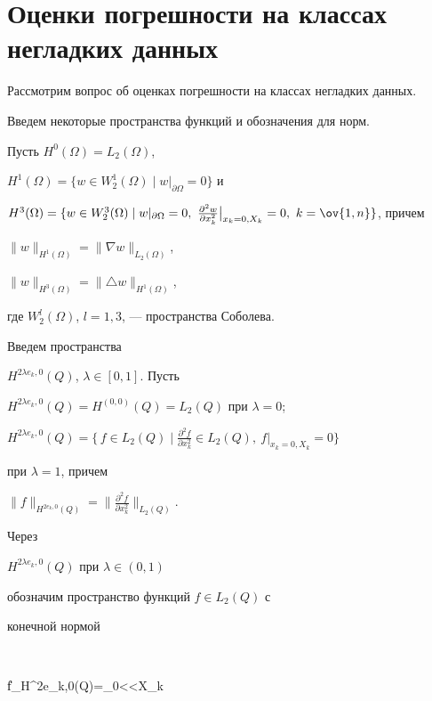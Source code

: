 \section{Оценки погрешности на классах негладких данных}





Рассмотрим вопрос об оценках погрешности на классах негладких данных.


Введем некоторые пространства функций и обозначения для норм.


Пусть $H^0(\Omega)=L_2(\Omega)$, 


$H^1(\Omega)=\{w\in W_2^1(\Omega)\mid


w|_{\partial\Omega}=0\}$ и


$H^3(\Omega)=\{w\in W_2^3(\Omega)\mid


w|_{\partial\Omega}=0,\ 


\frac{\partial^2 w}{\partial x_k^2}\big|_{x_k=0,X_k}=0,\ 


k=\ov{1,n}\}$, причем


$\|w\|_{H^1(\Omega)}=


\|\nabla w\|_{L_2(\Omega)}$,


$\|w\|_{H^3(\Omega)}=\|\triangle w\|_{H^1(\Omega)}$,


где $W_2^l(\Omega)$, $l=1,3$, --- пространства Соболева.





Введем пространства 


$H^{2\lambda e_k,0}(Q)$, $\lambda\in[0,1]$. Пусть


$H^{2\lambda e_k,0}(Q)=H^{(0,0)}(Q)=L_2(Q)$ при $\lambda=0$;


$H^{2\lambda e_k,0}(Q)=\{\, f\in L_2(Q)\mid


\frac{\partial^2 f}{\partial x_k^2}\in L_2(Q),\ f|_{x_k=0,X_k}=0\}$


при $\lambda=1$, причем


$\|f\|_{H^{2e_k,0}(Q)}=\Big\|\frac{\partial^2 f}{\partial x_k^2}


\Big\|_{L_2(Q)}$.


Через  


$H^{2\lambda e_k,0}(Q)$ при $\lambda\in(0,1)$


обозначим пространство функций $f\in L_2(Q)$ с 


конечной нормой


$$


\|f\|_{H^{2\lambda e_k,0}(Q)}=\sup_{0<\gamma <X_k}


